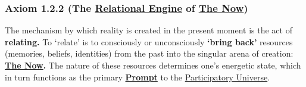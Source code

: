 \documentclass{article}
\begin{document}
\subsubsection*{Axiom 1.2.2 (The \hyperlink{gloss:relational_engine}{Relational Engine} of \textbf{\hyperlink{gloss:the_now}{The Now}})} \label{axiom_1_2_2_the_relational_engine_of_the_now}
The mechanism by which reality is created in the present moment is the act of \textbf{relating.} To `relate' is to consciously or unconsciously \textbf{`bring back'} resources (memories, beliefs, identities) from the past into the singular arena of creation: \textbf{\hyperlink{gloss:the_now}{The Now}.} The nature of these resources determines one's energetic state, which in turn functions as the primary \textbf{\hyperlink{gloss:prompt}{Prompt}} to the \hyperlink{gloss:participatory_universe}{Participatory Universe}.
\end{document}
